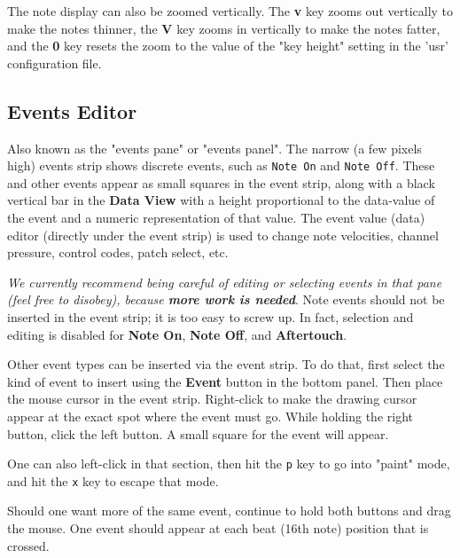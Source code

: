    The note display can also be zoomed vertically.
   The \textbf{v} key zooms out vertically to make the notes thinner,
   the \textbf{V} key zooms in vertically to make the notes fatter,
   and the \textbf{0} key resets the zoom to the value of the "key height"
   setting in the 'usr' configuration file.
   
\subsection{Events Editor}
\label{subsec:pattern_editor_events}

   Also known as the "events pane" or "events panel".
   The narrow (a few pixels high) events strip shows discrete events,
   such as \texttt{Note On} and \texttt{Note Off}.
   These and other events appear
   as small squares in the event strip, along with a black vertical bar
   in the \textbf{Data View} with a
   height proportional to the data-value of the event and a numeric
   representation of that value.
	The event value (data) editor (directly under the event strip) is used 
	to change note velocities, channel pressure, control codes,
	patch select, etc.

   \textsl{We currently recommend being careful of editing or selecting events
   in that pane (feel free to disobey), because
   \textbf{more work is needed}}.
   Note events should not be inserted in the event strip; it is too easy to
   screw up.  In fact, selection and editing is disabled for
   \textbf{Note On}, \textbf{Note Off}, and \textbf{Aftertouch}.

   Other event types can be inserted via the event strip.
   To do that, first select the kind of event to insert using the
   \textbf{Event} button in the bottom panel.
   Then place the mouse cursor in the event strip.
   Right-click to make the drawing cursor appear at the exact spot where the
   event must go.  While holding the right button, click the left button.
   A small square for the event will appear.

   One can also left-click in that section,
   then hit the \texttt{p} key to go into "paint" mode,
   and hit the \texttt{x} key to escape that mode.

   Should one want more of the same event, continue to hold both buttons and
   drag the mouse.  One event should appear at each beat (16th note) position
   that is crossed.

